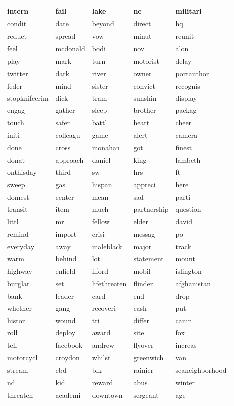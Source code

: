 \begin{longtable}{p{2.5cm}p{2.5cm}p{2.5cm}p{2.5cm}p{2.5cm}}
intern&fail&lake&ne&militari\\ \hline 
condit&date&beyond&direct&hq\\ \hline 
reduct&spread&vow&minut&reunit\\ \hline 
feel&mcdonald&bodi&nov&alon\\ \hline 
play&mark&turn&motorist&delay\\ \hline 
twitter&dark&river&owner&portauthor\\ \hline 
feder&mind&sister&convict&recognis\\ \hline 
stopknifecrim&dick&tram&sunshin&display\\ \hline 
engag&gather&sleep&brother&packag\\ \hline 
touch&safer&battl&heart&cheer\\ \hline 
initi&colleagu&game&alert&camera\\ \hline 
done&cross&monahan&got&finest\\ \hline 
donat&approach&daniel&king&lambeth\\ \hline 
onthisday&third&sw&hrs&ft\\ \hline 
sweep&gas&hispan&appreci&here\\ \hline 
domest&center&mean&sad&parti\\ \hline 
transit&item&much&partnership&question\\ \hline 
littl&mr&fellow&elder&david\\ \hline 
remind&import&crisi&messag&po\\ \hline 
everyday&away&maleblack&major&track\\ \hline 
warm&behind&lot&statement&mount\\ \hline 
highway&enfield&ilford&mobil&islington\\ \hline 
burglar&set&lifethreaten&flinder&afghanistan\\ \hline 
bank&leader&card&end&drop\\ \hline 
whether&gang&recoveri&cash&put\\ \hline 
histor&wound&tri&differ&canin\\ \hline 
roll&deploy&award&site&fox\\ \hline 
tell&facebook&andrew&flyover&increas\\ \hline 
motorcycl&croydon&whilst&greenwich&van\\ \hline 
stream&cbd&blk&rainier&seaneighborhood\\ \hline 
nd&kid&reward&abus&winter\\ \hline 
threaten&academi&downtown&sergeant&age\\ \hline 

\end{longtable}
